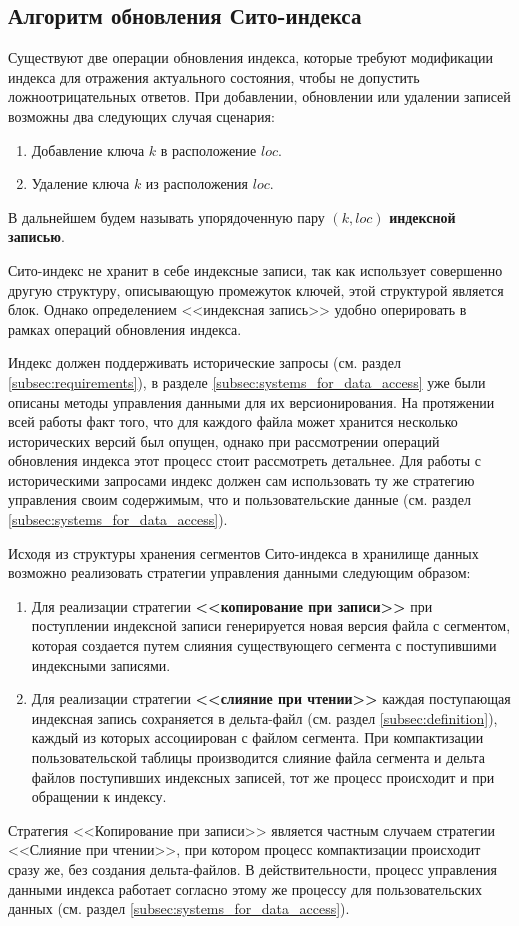 \subsection{Алгоритм обновления Сито-индекса}\label{subsec:update}

Существуют две операции обновления индекса, которые требуют модификации индекса для отражения актуального состояния, чтобы не допустить ложноотрицательных ответов. При добавлении, обновлении или удалении записей возможны два следующих случая сценария: 
\begin{enumerate}
    \item Добавление ключа $k$ в расположение $loc$.
    \item Удаление ключа $k$ из расположения $loc$.
\end{enumerate}

В дальнейшем будем называть упорядоченную пару $(k, loc)$ \textbf{индексной записью}.

Сито-индекс не хранит в себе индексные записи, так как использует совершенно другую структуру, описывающую промежуток ключей, этой структурой является блок. Однако определением {<<индексная запись>>} удобно оперировать в рамках операций обновления индекса.

Индекс должен поддерживать исторические запросы (см. раздел \ref{subsec:requirements}), в разделе \ref{subsec:systems_for_data_access} уже были описаны методы управления данными для их версионирования. На протяжении всей работы факт того, что для каждого файла может хранится несколько исторических версий был опущен, однако при рассмотрении операций обновления индекса этот процесс стоит рассмотреть детальнее. Для работы с историческими запросами индекс должен сам использовать ту же стратегию управления своим содержимым, что и пользовательские данные (см. раздел \ref{subsec:systems_for_data_access}).

Исходя из структуры хранения сегментов Сито-индекса в хранилище данных возможно реализовать стратегии управления данными следующим образом:
\begin{enumerate}
    \item Для реализации стратегии \textbf{<<копирование при записи>>} при поступлении индексной записи генерируется новая версия файла с сегментом, которая создается путем слияния существующего сегмента с поступившими индексными записями.
    \item Для реализации стратегии \textbf{<<слияние при чтении>>} каждая поступающая индексная запись сохраняется в дельта-файл (см. раздел \ref{subsec:definition}), каждый из которых ассоциирован с файлом сегмента. При компактизации пользовательской таблицы производится слияние файла сегмента и дельта файлов поступивших индексных записей, тот же процесс происходит и при обращении к индексу.
\end{enumerate}
Стратегия {<<Копирование при записи>>} является частным случаем стратегии {<<Слияние при чтении>>}, при котором процесс компактизации происходит сразу же, без создания дельта-файлов. В действительности, процесс управления данными индекса работает согласно этому же процессу для пользовательских данных (см. раздел \ref{subsec:systems_for_data_access}).

